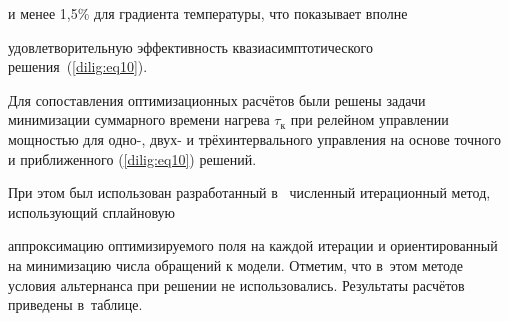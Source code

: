 и менее 1,5{\%} для градиента температуры, что показывает вполне

удовлетворительную эффективность квазиасимптотического решения~(\ref{dilig:eq10}).





Для сопоставления оптимизационных расчётов были решены задачи минимизации суммарного времени нагрева $\tau_{\text{к}} $ при релейном управлении мощностью для одно-, двух- и трёхинтервального управления на основе точного и приближенного (\ref{dilig:eq10}) решений. 

При этом был использован разработанный в~\cite{dilig:bib5,dilig:bib6} численный итерационный метод, использующий сплайновую

аппроксимацию оптимизируемого поля на каждой итерации и ориентированный на минимизацию числа обращений к модели. Отметим, что в~этом методе условия альтернанса при решении не использовались. Результаты расчётов приведены в~таблице.















